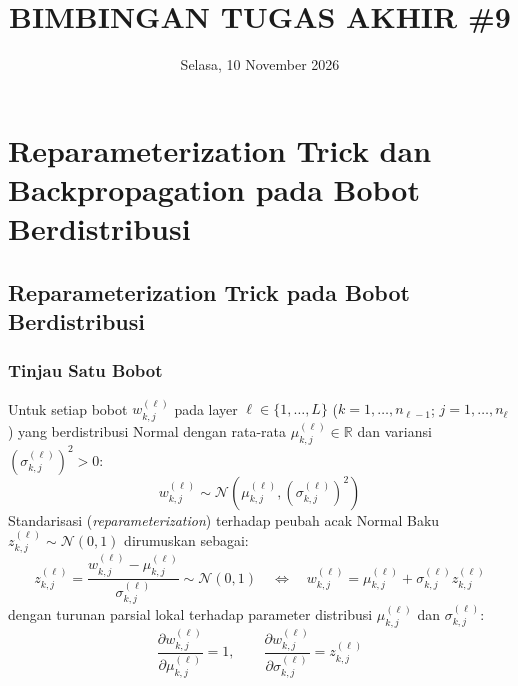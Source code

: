 \documentclass[11pt,a4paper]{article}
\title{
    \vspace{-1.6cm}
    \textbf{\Large BIMBINGAN TUGAS AKHIR \#9} \\[0.2em]
}
\author{}
\date{\vspace{-0.6cm} Selasa, 10 November 2026}
\theoremstyle{plain}
\theoremstyle{definition}
\theoremstyle{remark}
\begin{document}
\maketitle
\vspace{-1.1cm}
\setlength{\abovedisplayskip}{3pt}
\setlength{\belowdisplayskip}{3pt}
\setlength{\abovedisplayshortskip}{1pt}
\setlength{\belowdisplayshortskip}{1pt}

\section{Reparameterization Trick dan Backpropagation pada Bobot Berdistribusi}
\label{sec:reparam}

\subsection{Reparameterization Trick pada Bobot Berdistribusi}
\label{subsec:ide_reparam}

\subsubsection{Tinjau Satu Bobot}
\label{subsubsec:tinjau_satu_bobot}

\noindent Untuk setiap bobot $w^{(\ell)}_{k, j}$ pada layer $\ell \in \{1, \dots, L\}$ ($k = 1, \dots, n_{\ell-1}$; $j = 1, \dots, n_\ell$) yang berdistribusi Normal dengan rata-rata $\mu^{(\ell)}_{k, j} \in \mathbb{R}$ dan variansi $\left(\sigma^{(\ell)}_{k, j}\right)^2 > 0$:
\begin{equation}
    w^{(\ell)}_{k, j} \sim \mathcal{N}\!\left( \mu^{(\ell)}_{k, j}, \left(\sigma^{(\ell)}_{k, j}\right)^2 \right) \label{eq:w_gaussian}
\end{equation}
Standarisasi (\textit{reparameterization}) terhadap peubah acak Normal Baku $z^{(\ell)}_{k, j} \sim \mathcal{N}(0, 1)$ dirumuskan sebagai:
\begin{equation}
    z^{(\ell)}_{k, j} = \frac{w^{(\ell)}_{k, j} - \mu^{(\ell)}_{k, j}}{\sigma^{(\ell)}_{k, j}} \sim \mathcal{N}(0, 1) \quad \Longleftrightarrow \quad w^{(\ell)}_{k, j} = \mu^{(\ell)}_{k, j} + \sigma^{(\ell)}_{k, j} z^{(\ell)}_{k, j} \label{eq:reparam_scalar}
\end{equation}
dengan turunan parsial lokal terhadap parameter distribusi $\mu^{(\ell)}_{k, j}$ dan $\sigma^{(\ell)}_{k, j}$:
\begin{equation}
    \frac{\partial w^{(\ell)}_{k, j}}{\partial \mu^{(\ell)}_{k, j}} = 1, \qquad \frac{\partial w^{(\ell)}_{k, j}}{\partial \sigma^{(\ell)}_{k, j}} = z^{(\ell)}_{k, j} \label{eq:local_deriv_w}
\end{equation}
\end{document}
